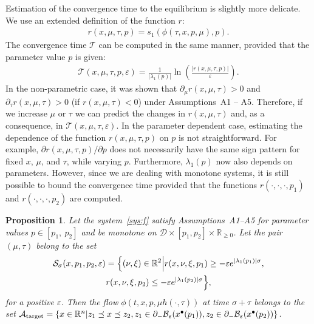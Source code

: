 \documentclass[letterpaper, 10pt, journal]{IEEEtran}  %
\newcommand{\R}{{\mathbb R}}
\newcommand{\Rnn}{{\mathbb R}_{\ge 0}}
\newcommand{\cA}{{\mathcal A}}
\newcommand{\cB}{{\mathcal B}}
\newcommand{\cD}{{\mathcal D}}
\newcommand{\cS}{{\mathcal S}}
\newcommand{\cT}{{\mathcal T}}
\newtheorem{prop}{Proposition}
\begin{document}
Estimation of the convergence time to the equilibrium is slightly more delicate. We use an extended definition of the function $r$:
\begin{gather*}
r(x, \mu, \tau, p) = s_1(\phi(\tau,x, p,\mu),p).
\end{gather*} 
The convergence time $\cT$ can be computed in the same manner, provided that the parameter value $p$ is given:
\begin{gather*}
\cT(x, \mu, \tau, p, \varepsilon) = \frac{1} {|\lambda_1(p)|} \ln\left(\frac{|r(x,\mu,\tau, p)|}{\varepsilon}\right).
\end{gather*} 
In the non-parametric case, it was shown that $\partial_\mu r(x, \mu, \tau)>0$ and $\partial_\tau r(x, \mu, \tau)>0$ (if $r(x,\mu,\tau) < 0$) under Assumptions~{A1 -- A5}. Therefore, if we increase $\mu$ or $\tau$ we can predict the changes in $r(x, \mu, \tau)$ and, as a consequence, in $\cT(x, \mu, \tau, \varepsilon)$. In the parameter dependent case, estimating the dependence of the function $r(x, \mu, \tau, p)$ on $p$ is not straightforward. For example, $\partial r(x, \mu, \tau, p)/\partial p$ does not necessarily have the same sign pattern for fixed $x$, $\mu$, and $\tau$, while varying $p$. Furthermore, $\lambda_1(p)$ now also depends on parameters. However, since we are dealing with monotone systems, it is still possible to bound the convergence time provided that the functions $r(\cdot, \cdot, \cdot, p_1)$ and $r(\cdot, \cdot, \cdot, p_2)$ are computed.
\begin{prop}\label{prop:param-iso}
Let the system~\eqref{sys:f} satisfy Assumptions~{A1--A5} for parameter values $p \in[p_1,~ p_2]$ and be monotone on $\cD\times [p_1, p_2]\times \Rnn$.	Let the pair $(\mu,\tau)$ belong to the set
\begin{multline*}
\cS_\sigma(x, p_1, p_2, \varepsilon) = \Bigl\{(\nu,\xi)\in\R^2\Bigl| r(x,\nu,\xi, p_1) \ge -\varepsilon e^{|\lambda_1(p_1)| \sigma},  \\
r(x,\nu,\xi,p_2) \le -\varepsilon e^{|\lambda_1(p_2)| \sigma}\Bigl\},
\end{multline*}
for a positive $\varepsilon$. Then the flow $\phi(t, x, p, \mu h(\cdot,\tau))$ at time $\sigma + \tau$ belongs to the set $\cA_{\rm target} = \{x\in\R^n | z_1 \preceq x \preceq z_2, z_1 \in \partial_-\cB_\varepsilon(x^\bullet(p_1)), z_2 \in \partial_-\cB_\varepsilon(x^\bullet(p_2))\} $.
\end{prop}
\end{document}
